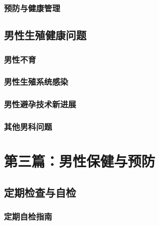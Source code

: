 \section{预防与健康管理}

\chapter{男性生殖健康问题}

\section{男性不育}

\section{男性生殖系统感染}

\section{男性避孕技术新进展}

\section{其他男科问题}

\part*{第三篇：男性保健与预防}

\chapter{定期检查与自检}

\section{定期自检指南}

